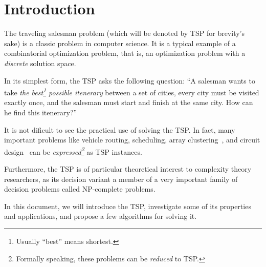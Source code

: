 \chapter*{Introduction}

The traveling salesman problem (which will be denoted by \textsf{TSP} for brevity's sake) is a classic problem in computer science. It is a typical example of a combinatorial optimization problem, that is, an optimization problem with a \emph{discrete} solution space.

In its simplest form, the \textsf{TSP} asks the following question: ``A salesman wants to take \emph{the best\footnote{Usually ``best'' means shortest.} possible itenerary} between a set of cities, every city must be visited exactly once, and the salesman must start and finish at the same city. How can he find this itenerary?''

It is not dificult to see the practical use of solving the \textsf{TSP}. 
In fact, many important problems like vehicle routing, scheduling, array clustering~\cite{tsp-tour}, and circuit design~\cite{tsp-computational-solutions} can be \emph{expressed\footnote{Formally speaking, these problems can be \emph{reduced} to \textsf{TSP.}}} as \textsf{TSP} instances.

Furthermore, the \textsf{TSP} is of particular theoretical interest to complexity theory researchers, as its decision variant a member of a very important family of decision problems called \textsf{NP}-complete problems.

In this document, we will introduce the \textsf{TSP}, investigate some of its properties and applications, and propose a few algorithms for solving it.
